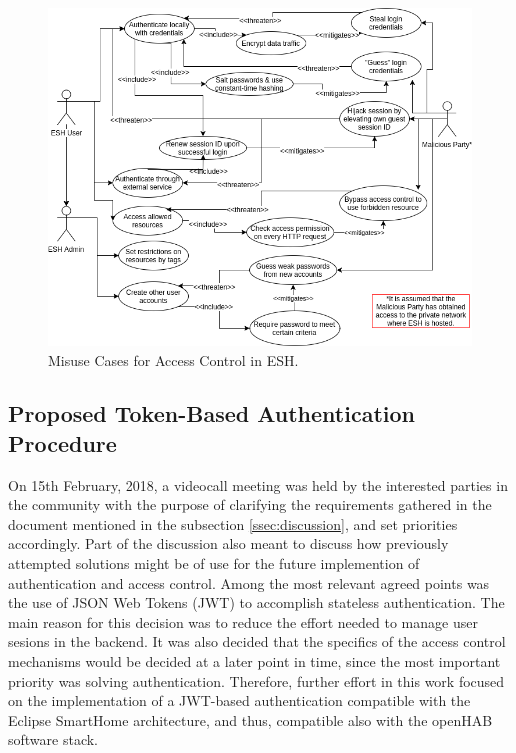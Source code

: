 \documentclass[12pt]{article}
\begin{document}
\begin{figure} [ht] 
\begin{center}
\includegraphics[width=\textwidth]{esh_misuse_cases}
\caption{Misuse Cases for Access Control in ESH.}
\label{fig:misuse_cases}
\end{center}
\end{figure}

\subsection{Proposed Token-Based Authentication Procedure}

On 15th February, 2018, a videocall meeting was held by the interested parties in the community with the purpose of clarifying the requirements gathered in the document mentioned in the subsection \ref{ssec:discussion}, and set priorities accordingly. Part of the discussion also meant to discuss how previously attempted solutions might be of use for the future implemention of authentication and access control. Among the most relevant agreed points was the use of JSON Web Tokens (JWT) to accomplish stateless authentication. The main reason for this decision was to reduce the effort needed to manage user sesions in the backend. It was also decided that the specifics of the access control mechanisms would be decided at a later point in time, since the most important priority was solving authentication. Therefore, further effort in this work focused on the implementation of a JWT-based authentication compatible with the Eclipse SmartHome architecture, and thus, compatible also with the openHAB software stack.
\end{document}
